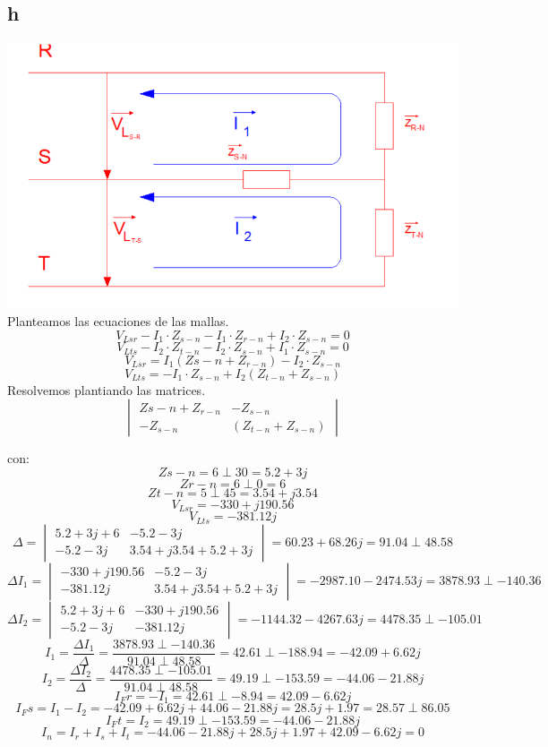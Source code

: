 \documentclass{article}
\begin{document}
\subsection{h}

\includegraphics[scale=0.5]{hola.png}
Planteamos las ecuaciones de las mallas.
\[V_{Lsr}-I_1\cdot Z_{s-n}-I_1\cdot Z_{r-n}+I_2\cdot Z_{s-n}=0\]
\[V_{Lts}-I_2\cdot Z_{t-n}-I_2\cdot Z_{s-n}+I_1\cdot Z_{s-n}=0\]
\[V_{Lsr}=I_1(Z{s-n}+Z_{r-n})-I_2\cdot Z_{s-n}\]
\[V_{Lts}=-I_1\cdot Z_{s-n}+I_2(Z_{t-n}+Z_{s-n})\]
Resolvemos plantiando las matrices.
\begin{equation}
\begin{vmatrix}
    Z{s-n}+Z_{r-n} & -Z_{s-n} \\
    -Z_{s-n} & (Z_{t-n}+Z_{s-n})
\end{vmatrix}
\end{equation}

con:
\[Z{s-n}=6\perp30=5.2+3j\]
\[Z{r-n}=6\perp0=6\]
\[Z{t-n}=5\perp45=3.54+j3.54\]
\[V_{Lsr}=-330+j190.56\]
\[V_{Lts}=-381.12j\]
\begin{equation}
\Delta=\begin{vmatrix}
    5.2+3j+6 & -5.2-3j \\
    -5.2-3j & 3.54+j3.54+5.2+3j
\end{vmatrix}=60.23+68.26j=91.04\perp48.58
\end{equation}
\begin{equation}
\Delta I_1=\begin{vmatrix}
    -330+j190.56 & -5.2-3j \\
    -381.12j & 3.54+j3.54+5.2+3j
\end{vmatrix}=-2987.10-2474.53j=3878.93\perp-140.36
\end{equation}
\begin{equation}
\Delta I_2=\begin{vmatrix}
    5.2+3j+6 & -330+j190.56 \\
    -5.2-3j & -381.12j
\end{vmatrix}=-1144.32-4267.63j=4478.35\perp-105.01
\end{equation}
\[I_1=\frac{\Delta I_1}{\Delta}=\frac{3878.93\perp-140.36}{91.04\perp48.58}=42.61\perp-188.94= -42.09+6.62j\]
\[I_2=\frac{\Delta I_2}{\Delta}=\frac{4478.35\perp-105.01}{91.04\perp48.58}=49.19\perp-153.59=−44.06 -21.88j\]
\[I_Fr=-I_1=42.61\perp-8.94=42.09-6.62j\]
\[I_Fs=I_1-I_2=−42.09+6.62j+44.06-21.88j=28.5j+1.97=28.57\perp86.05\]
\[I_Ft=I_2=49.19\perp-153.59=-44.06 -21.88j\]
\[I_{n}=I_r+I_s+I_t=−44.06 -21.88j+28.5j+1.97+42.09-6.62j=0\]
\end{document}
